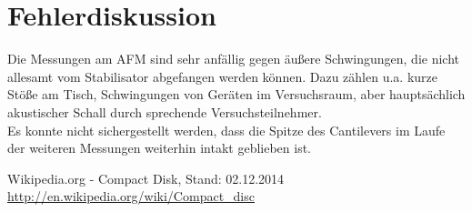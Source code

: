 \section{Fehlerdiskussion}
Die Messungen am AFM sind sehr anfällig gegen äußere Schwingungen, die nicht allesamt vom Stabilisator abgefangen werden können. Dazu zählen u.a. kurze Stöße am Tisch, Schwingungen von Geräten im Versuchsraum, aber hauptsächlich akustischer Schall durch sprechende Versuchsteilnehmer.\\
Es konnte nicht sichergestellt werden, dass die Spitze des Cantilevers im Laufe der weiteren Messungen weiterhin intakt geblieben ist.
\begin{thebibliography}{10}
 Wikipedia.org - Compact Disk, Stand: 02.12.2014\\
\url{http://en.wikipedia.org/wiki/Compact_disc}
\end{thebibliography}

